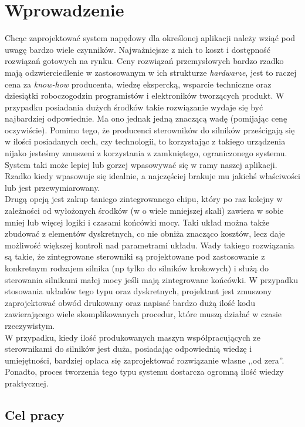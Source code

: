 \section*{Wprowadzenie}

Chcąc zaprojektować system napędowy dla określonej aplikacji należy wziąć pod uwagę bardzo wiele czynników. Najważniejsze z nich to koszt i dostępność rozwiązań gotowych na rynku. Ceny rozwiązań przemysłowych bardzo rzadko mają odzwierciedlenie w zastosowanym w ich strukturze {\it hardwarze}, jest to raczej cena za {\it know-how} producenta, wiedzę ekspercką, wsparcie techniczne oraz dziesiątki roboczogodzin programistów i elektroników tworzących produkt. W przypadku posiadania dużych środków takie rozwiązanie wydaje się być najbardziej odpowiednie. Ma ono jednak jedną znaczącą wadę (pomijając cenę oczywiście). Pomimo tego, że producenci sterowników do silników prześcigają się w ilości posiadanych cech, czy technologii, to korzystając z takiego urządzenia nijako jesteśmy zmuszeni z korzystania z zamkniętego, ograniczonego systemu. System taki może lepiej lub gorzej wpasowywać się w ramy naszej aplikacji. Rzadko kiedy wpasowuje się idealnie, a najczęściej brakuje mu jakichś właściwości lub jest przewymiarowany. \\

Drugą opcją jest zakup taniego zintegrowanego chipu, który po raz kolejny w zależności od wyłożonych środków (w o wiele mniejszej skali) zawiera w sobie mniej lub więcej logiki i czasami końcówki mocy. Taki układ można także zbudować z elementów dyskretnych, co nie obniża znacząco kosztów, lecz daje możliwość większej kontroli nad parametrami układu. Wady takiego rozwiązania są takie, że zintegrowane sterowniki są projektowane pod zastosowanie z konkretnym rodzajem silnika (np tylko do silników krokowych) i służą do sterowania silnikami małej mocy jeśli mają zintegrowane końcówki. W przypadku stosowania układów tego typu oraz dyskretnych, projektant jest zmuszony zaprojektować obwód drukowany oraz napisać bardzo dużą ilość kodu zawierającego wiele skomplikowanych procedur, które muszą działać w czasie rzeczywistym. \\

W przypadku, kiedy ilość produkowanych maszyn współpracujących ze sterownikami do silników jest duża, posiadając odpowiednią wiedzę i umiejętności, bardziej opłaca się zaprojektować rozwiązanie własne ,,od zera''. Ponadto, proces tworzenia tego typu systemu dostarcza ogromną ilość wiedzy praktycznej.
  
\subsection*{Cel pracy}

